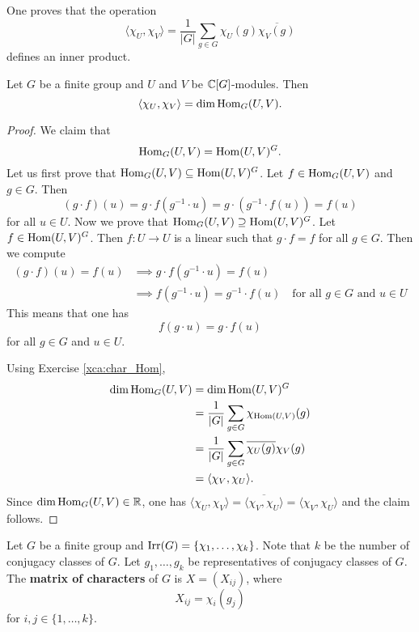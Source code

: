 One proves that 
the operation 
\[
\langle\chi_U,\chi_V\rangle=\frac{1}{|G|}\sum_{g\in G}\chi_U(g)\overline{\chi_V(g)}
\]
defines an inner product. 

\begin{theorem}
    Let $G$ be a finite group and $U$ and $V$ be $\mathbb{C}[G]$-modules. 
    Then 
    \[
    \langle\chi_U,\chi_V\rangle=\dim\operatorname{Hom}_G(U,V).
    \]
\end{theorem}

\begin{proof}
    We claim that 
    \[
    \operatorname{Hom}_G(U,V)=\operatorname{Hom}(U,V)^G.
    \]
    Let us first prove that
    $\operatorname{Hom}_G(U,V)\subseteq\operatorname{Hom}(U,V)^G$. Let $f\in \operatorname{Hom}_G(U,V)$ and 
    $g\in G$. Then
    \[
    (g\cdot f)(u)=g\cdot f(g^{-1}\cdot u)=g\cdot (g^{-1}\cdot f(u))=f(u)
    \]
    for all $u\in U$. Now we prove that $\operatorname{Hom}_G(U,V)\supseteq\operatorname{Hom}(U,V)^G$.
    Let $f\in\operatorname{Hom}(U,V)^G$. Then $f\colon U\to U$ is a linear such that
    $g\cdot f=f$ for all $g\in G$. Then
    we compute 
    \begin{align*}
    (g\cdot f)(u)=f(u)&\implies 
    g\cdot f(g^{-1}\cdot u)=f(u)\\
    &\implies f(g^{-1}\cdot u)=g^{-1}\cdot f(u)\quad 
    \text{for all $g\in G$ and $u\in U$}
    \end{align*}
    This means that one has 
    \[
    f(g\cdot u)=g\cdot f(u)
    \]
    for all $g\in G$ and $u\in U$. 
    
    Using Exercise \ref{xca:char_Hom}, 
    \begin{align*}
        \dim\operatorname{Hom}_G(U,V) &= \dim\operatorname{Hom}(U,V)^G\\
        &=\frac{1}{|G|}\sum_{g\in G}\chi_{\operatorname{Hom}(U,V)}(g)\\
        &=\frac{1}{|G|}\sum_{g\in G}\overline{\chi_U(g)}\chi_V(g)\\
        &=\langle \chi_V,\chi_U\rangle.
    \end{align*}
    Since $\dim\operatorname{Hom}_G(U,V)\in\mathbb{R}$, one has  
    $\langle\chi_U,\chi_V\rangle=\overline{\langle\chi_V,\chi_U\rangle}=\langle\chi_V,\chi_U\rangle$ and the claim follows. 
\end{proof}

Let $G$ be a finite group and $\operatorname{Irr}(G)=\{\chi_1,\dots,\chi_k\}$. 
Note that $k$ be the number of conjugacy classes of $G$. Let 
$g_1,\dots,g_k$ be representatives of conjugacy classes of $G$. 
The \textbf{matrix of characters} of $G$ 
is $X=(X_{ij})$, where 
\[
X_{ij}=\chi_i(g_j)
\]
for $i,j\in\{1,\dots,k\}$. 


